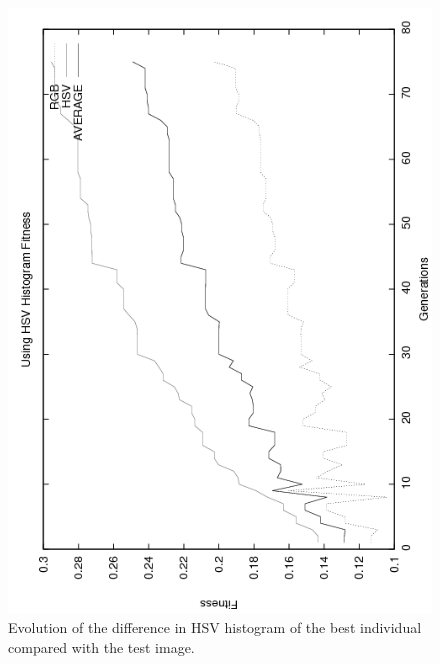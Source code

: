 {\begin{figure}
   \includegraphics[angle=-90,scale =0.40] {gfx/art/hsvgens.png}
\caption{Evolution of the difference in HSV histogram of the best individual compared with the test image. }
\label{fig:hsvgens}
\end{figure}

}
